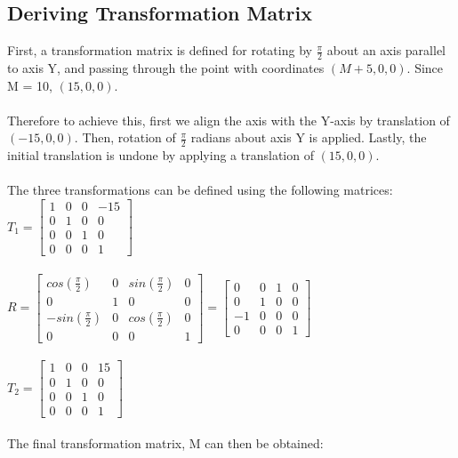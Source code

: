 \documentclass[acmlarge,nonacm=true]{acmart}
\begin{document}
\subsection{Deriving Transformation Matrix}
\label{section:1a}
First, a transformation matrix is defined for rotating by $\frac{\pi}{2}$ about an axis parallel to axis Y,
and passing through the point with coordinates $(M+5, 0, 0)$. Since M = 10, $(15, 0, 0)$.\\\\
Therefore to achieve this, first we align the axis with the Y-axis by translation of $(-15, 0, 0)$. Then, 
rotation of $\frac{\pi}{2}$ radians about axis Y is applied. Lastly, the initial translation is undone by 
applying a translation of $(15, 0, 0)$.\\\\
The three transformations can be defined using the following matrices:\\
$T_1 = \begin{bmatrix}
	1 & 0 & 0 & -15 \\
	0 & 1 & 0 & 0 \\
	0 & 0 & 1 & 0 \\
	0 & 0 & 0 & 1
 \end{bmatrix}$\\\\
$R = \begin{bmatrix}
	cos(\frac{\pi}{2}) & 0 & sin(\frac{\pi}{2}) & 0 \\
	0 & 1 & 0 & 0 \\
	-sin(\frac{\pi}{2}) & 0 & cos(\frac{\pi}{2}) & 0 \\
	0 & 0 & 0 & 1
 \end{bmatrix} = \begin{bmatrix}
	0 & 0 & 1 & 0 \\
	0 & 1 & 0 & 0 \\
	-1 & 0 & 0 & 0 \\
	0 & 0 & 0 & 1
 \end{bmatrix}$\\\\
$T_2 = \begin{bmatrix}
	1 & 0 & 0 & 15 \\
	0 & 1 & 0 & 0 \\
	0 & 0 & 1 & 0 \\
	0 & 0 & 0 & 1
 \end{bmatrix}$\\\\
The final transformation matrix, M can then be obtained:\\
\end{document}
